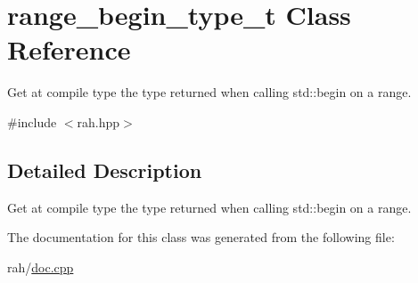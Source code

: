 \hypertarget{classrange__begin__type__t}{}\section{range\+\_\+begin\+\_\+type\+\_\+t Class Reference}
\label{classrange__begin__type__t}


Get at compile type the type returned when calling std\+::begin on a range.  




{\ttfamily \#include $<$rah.\+hpp$>$}



\subsection{Detailed Description}
Get at compile type the type returned when calling std\+::begin on a range. 


\begin{DoxyCode}{0}
\end{DoxyCode}
 

The documentation for this class was generated from the following file\+:\begin{DoxyCompactItemize}
\item 
rah/\mbox{\hyperlink{doc_8cpp}{doc.\+cpp}}\end{DoxyCompactItemize}
